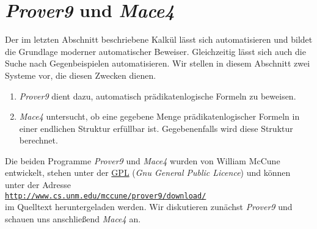 \section{\textsl{Prover9} und \textsl{Mace4}}
Der im letzten Abschnitt beschriebene Kalk\"{u}l l\"{a}sst sich automatisieren und bildet die Grundlage moderner
automatischer Beweiser.  Gleichzeitig l\"{a}sst sich auch die Suche nach Gegenbeispielen automatisieren.
Wir stellen in diesem Abschnitt zwei Systeme vor, die diesen Zwecken dienen.
\begin{enumerate}
\item \textsl{Prover9} dient dazu, automatisch pr\"{a}dikatenlogische Formeln zu beweisen.
\item \textsl{Mace4} untersucht, ob eine gegebene Menge pr\"{a}dikatenlogischer Formeln in einer endlichen
  Struktur erf\"{u}llbar ist.  Gegebenenfalls wird diese Struktur berechnet.
\end{enumerate}
Die beiden Programme \textsl{Prover9} und \textsl{Mace4} wurden von William McCune \cite{mccune:2010} 
entwickelt, stehen unter der \href{http://www.gnu.org/licenses/gpl.html}{GPL} (\emph{Gnu General
  Public Licence}) und k\"{o}nnen unter der Adresse 
\\[0.2cm]
\hspace*{1.3cm}
\href{http://www.cs.unm.edu/~mccune/prover9/download/}{\texttt{http://www.cs.unm.edu/mccune/prover9/download/}}
\\[0.2cm]
im Quelltext heruntergeladen werden.  Wir diskutieren zun\"{a}chst \textsl{Prover9} und schauen uns anschlie\ss{}end
\textsl{Mace4} an.

